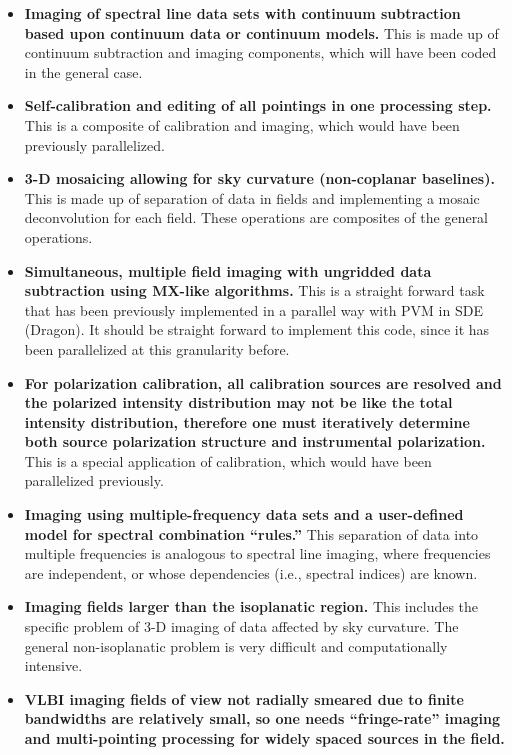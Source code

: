 \begin{itemize}

\item {\bf Imaging of spectral line data sets with continuum
subtraction based upon continuum data or continuum models.}  This is
made up of continuum subtraction and imaging components, which will
have been coded in the general case.

\item {\bf Self-calibration and editing of all pointings in one
processing step.}  This is a composite of calibration and imaging,
which would have been previously parallelized.

\item {\bf 3-D mosaicing allowing for sky curvature (non-coplanar
baselines).}  This is made up of separation of data in fields and
implementing a mosaic deconvolution for each field.  These operations
are composites of the general operations.

\item {\bf Simultaneous, multiple field imaging with ungridded data
subtraction using MX-like algorithms.}  This is a straight forward
task that has been previously implemented in a parallel way with PVM
in SDE (Dragon).  It should be straight forward to implement this
code, since it has been parallelized at this granularity before.

\item {\bf For polarization calibration, all calibration sources are
resolved and the polarized intensity distribution may not be like the
total intensity distribution, therefore one must iteratively determine
both source polarization structure and instrumental polarization.}
This is a special application of calibration, which would have been
parallelized previously.

\item {\bf Imaging using multiple-frequency data sets and a
user-defined model for spectral combination ``rules.''}  This
separation of data into multiple frequencies is analogous to spectral
line imaging, where frequencies are independent, or whose dependencies
(i.e., spectral indices) are known.

\item {\bf Imaging fields larger than the isoplanatic region.}  This
includes the specific problem of 3-D imaging of data affected by sky
curvature.  The general non-isoplanatic problem is very difficult and
computationally intensive.

\item {\bf VLBI imaging fields of view not radially smeared due to
finite bandwidths are relatively small, so one needs ``fringe-rate''
imaging and multi-pointing processing for widely spaced sources in the
field.}

\end{itemize}

